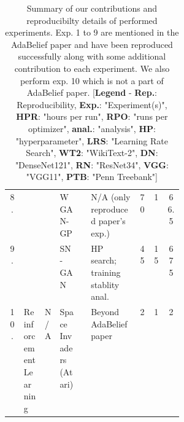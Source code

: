 \begin{table}[t]
{\begin{tabular}{c  p{0.12\linewidth}  p{0.08\linewidth}  p{0.13\linewidth}  c  l  c  c  c}
		\cline{4-9}
		8. \rule{0pt}{9pt} & &   & WGAN-GP \cite{WGAN-GP} & \textcolor{green}{\checkmark} & N/A (only reproduced paper's \cite{zhuang_adabelief_2020} exp.) & 70 & 1 & 66.5 \\

		\cline{4-9}
		9. \rule{0pt}{9pt} & &   & SN-GAN \cite{SN-GAN} & \textcolor{green}{\checkmark} & HP search; training stablity anal. & 45 & 15 & 675 \\

		\hline
		10. & Reinforcement Learning & N/A & Space Invaders (Atari) & \textcolor{green}{\checkmark} & Beyond AdaBelief paper \cite{zhuang_adabelief_2020} & 2 & 1 & 2 \\

		\hline
		\end{tabular}
		}

		\vspace{2mm}
		\caption{Summary of our contributions and reproducibilty details of performed experiments. Exp. 1 to 9 are mentioned in the AdaBelief paper \cite{zhuang_adabelief_2020} and have been reproduced successfully along with some additional contribution to each experiment. We also perform exp. 10 which is not a part of AdaBelief paper.\hspace{\textwidth} [\textbf{Legend} - \textbf{Rep.}: Reproducibility, \textbf{Exp.}: "Experiment(s)", \textbf{HPR}: "hours per run", \textbf{RPO}: "runs per optimizer", \textbf{anal.}: "analysis", \textbf{HP}: "hyperparameter", \textbf{LRS}: "Learning Rate Search", \textbf{WT2}: "WikiText-2", \textbf{DN}: "DenseNet121", \textbf{RN}: "ResNet34", \textbf{VGG}: "VGG11", \textbf{PTB}: "Penn Treebank"]}
		\label{table:our_contribution}
\end{table}



